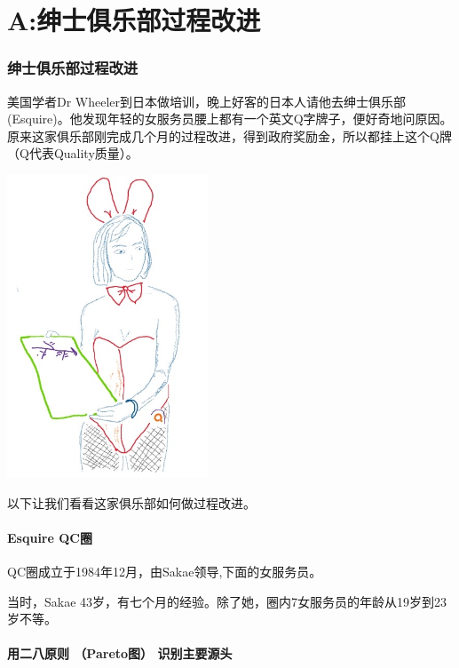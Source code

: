 \chapter{A:绅士俱乐部过程改进} %

\hypertarget{ux7ec5ux58ebux4ff1ux4e50ux90e8ux8fc7ux7a0bux6539ux8fdb}{%
\subsection{绅士俱乐部过程改进}\label{ux7ec5ux58ebux4ff1ux4e50ux90e8ux8fc7ux7a0bux6539ux8fdb}}

美国学者Dr Wheeler到日本做培训，晚上好客的日本人请他去绅士俱乐部(Esquire)。他发现年轻的女服务员腰上都有一个英文Q字牌子，便好奇地问原因。原来这家俱乐部刚完成几个月的过程改进，得到政府奖励金，所以都挂上这个Q牌（Q代表Quality质量）。


\includegraphics[width=6cm]{Esquire2Screenshot2023-10-271322091.jpg}

以下让我们看看这家俱乐部如何做过程改进。

\hypertarget{esquire-qcux5708}{%
\subsubsection{Esquire QC圈}\label{esquire-qcux5708}}

QC圈成立于1984年12月，由Sakae领导,下面的女服务员。

当时，Sakae
43岁，有七个月的经验。除了她，圈内7女服务员的年龄从19岁到23岁不等。

\hypertarget{ux7528ux4e8cux516bux539fux5219-paretoux56fe-ux8bc6ux522bux4e3bux8981ux6e90ux5934}{%
\subsubsection{用二八原则 （Pareto图）
识别主要源头}\label{ux7528ux4e8cux516bux539fux5219-paretoux56fe-ux8bc6ux522bux4e3bux8981ux6e90ux5934}}

